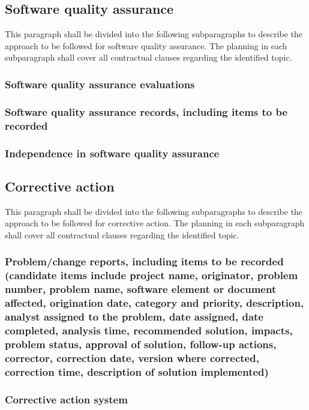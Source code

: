 \documentclass{fidata-report-template}
\begin{document}
\subsection{Software quality assurance}

This paragraph shall be divided into the following subparagraphs to
describe the approach to be followed for software quality assurance. The
planning in each subparagraph shall cover all contractual clauses
regarding the identified topic.

\subsubsection{Software quality assurance evaluations}

\subsubsection{Software quality assurance records, including items to
be recorded}

\subsubsection{Independence in software quality assurance}

\subsection{Corrective action}

This paragraph shall be divided into the following subparagraphs to
describe the approach to be followed for corrective action. The planning
in each subparagraph shall cover all contractual clauses regarding the
identified topic.

\subsubsection{Problem/change reports, including items to
be recorded (candidate items include project name, originator, problem
number, problem name, software element or document affected, origination
date, category and priority, description, analyst assigned to the
problem, date assigned, date completed, analysis time, recommended
solution, impacts, problem status, approval of solution, follow-up
actions, corrector, correction date, version where corrected, correction
time, description of solution implemented)}

\subsubsection{Corrective action system}
\end{document}
